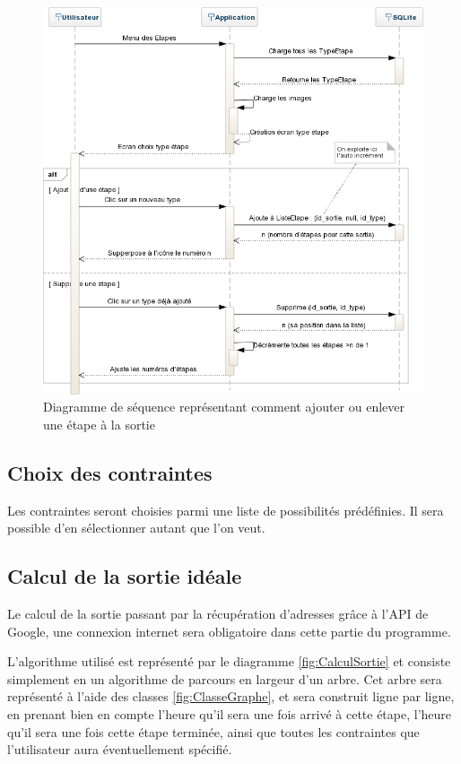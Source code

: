 \documentclass[a4paper, 12pt, notitlepage]{article} %
\begin{document}
\begin{figure}[!htb]
    \centering
    \includegraphics[width=1\textwidth]{Sequence_creer_une_liste_d_etapes.png}
    \caption[Diagramme de séquence de modification des étapes]{Diagramme de séquence représentant comment ajouter ou enlever une étape à la sortie}
    \label{fig:ChangeEtapes}
\end{figure}
\clearpage

\subsection{Choix des contraintes}
Les contraintes seront choisies parmi une liste de possibilités prédéfinies. Il sera possible d'en sélectionner autant que l'on veut.

\subsection{Calcul de la sortie idéale}
Le calcul de la sortie passant par la récupération d'adresses grâce à l'API de Google, une connexion internet sera obligatoire dans cette partie du programme.

L’algorithme utilisé est représenté par le diagramme \ref{fig:CalculSortie} et consiste simplement en un algorithme de parcours en largeur d'un arbre.
Cet arbre sera représenté à l'aide des classes \ref{fig:ClasseGraphe}, et sera construit ligne par ligne, en prenant bien en compte l'heure qu'il sera une fois arrivé à cette étape, l'heure qu'il sera une fois cette étape terminée, ainsi que toutes les contraintes que l'utilisateur aura éventuellement spécifié.
\end{document}
